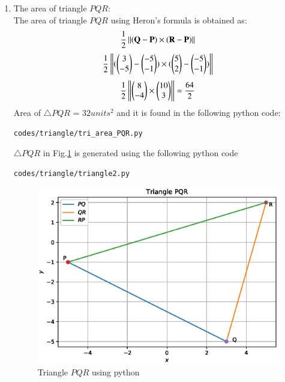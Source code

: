 \begin{enumerate}[label=\arabic*.,ref=\thesubsection.\theenumi]
\item The area of triangle $PQR$: \\
\solution The area of triangle $PQR$ using Heron's formula is obtained as:
$$\frac{1}{2}\left\lVert(\mathbf{Q}-\mathbf{P})\times(\mathbf{R}-\mathbf{P})\right\rVert$$
$$\frac{1}{2}\left\lVert(\begin{pmatrix}3\\-5\end{pmatrix}-\begin{pmatrix}-5\\-1\end{pmatrix})\times(\begin{pmatrix}5\\2\end{pmatrix}-\begin{pmatrix}-5\\-1\end{pmatrix})\right\rVert$$
$$\frac{1}{2}\left\lVert\begin{pmatrix}8\\-4\end{pmatrix} \times \begin{pmatrix}10\\3\end{pmatrix}\right\rVert = \frac{64}{2}$$
Area of $\triangle{PQR}$ = $32 units^2$
and it is found in the following python code:
\begin{lstlisting}
codes/triangle/tri_area_PQR.py
\end{lstlisting} 

$\triangle{PQR}$ in Fig.\ref{fig:triangle_2}  is generated using the following python code
\begin{lstlisting}
codes/triangle/triangle2.py
\end{lstlisting}
\begin{figure}[!ht]
\centering
\includegraphics[width=\columnwidth]{./codes/triangle/triangle2.eps}
\caption{Triangle $PQR$ using python}
\label{fig:triangle_2}
\end{figure} 
\end{enumerate}